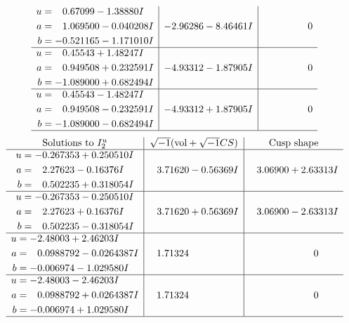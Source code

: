 \documentclass[1p]{elsarticle_modified}
\theoremstyle{definition}
\newcommand{\I}{\sqrt{-1}}
\begin{document}
$$\begin{array}{c|c|c}
\begin{aligned}
u &= \phantom{-}0.67099 - 1.38880 I \\
a &= \phantom{-}1.069500 - 0.040208 I \\
b &= -0.521165 - 1.171010 I\end{aligned}
 & -2.96286 - 8.46461 I & \phantom{-0.000000 } 0 \\ \hline\begin{aligned}
u &= \phantom{-}0.45543 + 1.48247 I \\
a &= \phantom{-}0.949508 + 0.232591 I \\
b &= -1.089000 + 0.682494 I\end{aligned}
 & -4.93312 - 1.87905 I & \phantom{-0.000000 } 0 \\ \hline\begin{aligned}
u &= \phantom{-}0.45543 - 1.48247 I \\
a &= \phantom{-}0.949508 - 0.232591 I \\
b &= -1.089000 - 0.682494 I\end{aligned}
 & -4.93312 + 1.87905 I & \phantom{-0.000000 } 0\\
 \hline 
 \end{array}$$\newpage$$\begin{array}{c|c|c}  
\text{Solutions to }I^u_{2}& \I (\text{vol} + \sqrt{-1}CS) & \text{Cusp shape}\\
 \hline 
\begin{aligned}
u &= -0.267353 + 0.250510 I \\
a &= \phantom{-}2.27623 - 0.16376 I \\
b &= \phantom{-}0.502235 + 0.318054 I\end{aligned}
 & \phantom{-}3.71620 - 0.56369 I & \phantom{-}3.06900 + 2.63313 I \\ \hline\begin{aligned}
u &= -0.267353 - 0.250510 I \\
a &= \phantom{-}2.27623 + 0.16376 I \\
b &= \phantom{-}0.502235 - 0.318054 I\end{aligned}
 & \phantom{-}3.71620 + 0.56369 I & \phantom{-}3.06900 - 2.63313 I \\ \hline\begin{aligned}
u &= -2.48003 + 2.46203 I \\
a &= \phantom{-}0.0988792 - 0.0264387 I \\
b &= -0.006974 - 1.029580 I\end{aligned}
 & \phantom{-}1.71324\phantom{ +0.000000I} & \phantom{-0.000000 } 0 \\ \hline\begin{aligned}
u &= -2.48003 - 2.46203 I \\
a &= \phantom{-}0.0988792 + 0.0264387 I \\
b &= -0.006974 + 1.029580 I\end{aligned}
 & \phantom{-}1.71324\phantom{ +0.000000I} & \phantom{-0.000000 } 0\\
 \hline 
 \end{array}$$\newpage\newpage\renewcommand{\arraystretch}{1}
\end{document}
